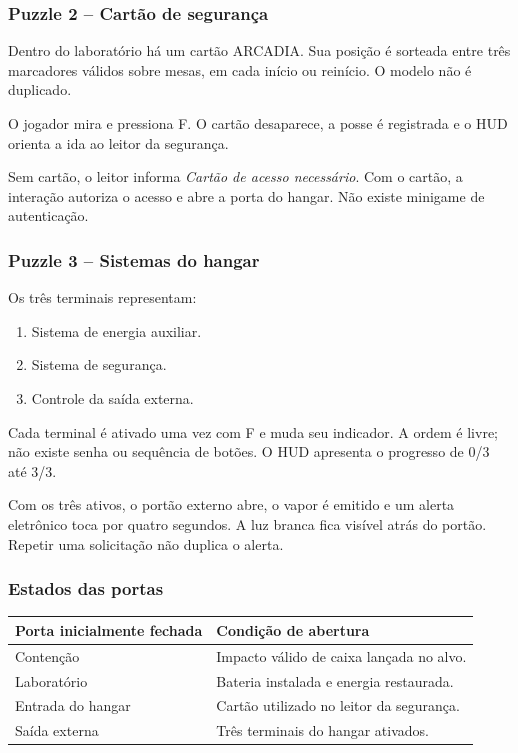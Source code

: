 \documentclass[12pt,a4paper]{article}
\begin{document}
\subsubsection*{Puzzle 2 -- Cartão de segurança}

Dentro do laboratório há um cartão ARCADIA. Sua posição é sorteada
entre três marcadores válidos sobre mesas, em cada início ou reinício.
O modelo não é duplicado.

O jogador mira e pressiona F. O cartão desaparece, a posse é
registrada e o HUD orienta a ida ao leitor da segurança.

Sem cartão, o leitor informa \emph{Cartão de acesso necessário}.
Com o cartão, a interação autoriza o acesso e abre a porta do hangar.
Não existe minigame de autenticação.

\subsubsection*{Puzzle 3 -- Sistemas do hangar}

Os três terminais representam:

\begin{enumerate}
\item Sistema de energia auxiliar.
\item Sistema de segurança.
\item Controle da saída externa.
\end{enumerate}

Cada terminal é ativado uma vez com F e muda seu indicador.
A ordem é livre; não existe senha ou sequência de botões.
O HUD apresenta o progresso de 0/3 até 3/3.

Com os três ativos, o portão externo abre, o vapor é emitido e um
alerta eletrônico toca por quatro segundos. A luz branca fica
visível atrás do portão. Repetir uma solicitação não duplica o alerta.

\subsubsection*{Estados das portas}

\begin{center}
\begin{tabularx}{\textwidth}{|p{3.3cm}|X|}
\hline
\textbf{Porta inicialmente fechada} & \textbf{Condição de abertura}\\
\hline
Contenção & Impacto válido de caixa lançada no alvo.\\
\hline
Laboratório & Bateria instalada e energia restaurada.\\
\hline
Entrada do hangar & Cartão utilizado no leitor da segurança.\\
\hline
Saída externa & Três terminais do hangar ativados.\\
\hline
\end{tabularx}
\end{center}
\end{document}
